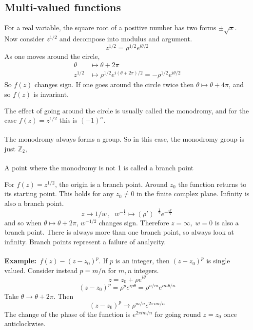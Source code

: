 \documentclass{article}
\newcommand{\example}{\textbf{Example:}}
\begin{document}
\subsection*{Multi-valued functions}
For a real variable, the square root of a positive number has two forms
$\pm \sqrt{x} $.
\\
Now consider $z^{1/2}$ and decompose into modulus and argument.
\[z^{1/2} = \rho^{1/2} e^{i\theta /2} \]
As one moves around the circle,
\begin{align*}
\theta & \mapsto \theta + 2\pi \\
z^{1/2} & \mapsto \rho^{1/2} e^{i(\theta + 2\pi)/2} = -\rho^{1/2}
e^{i\theta /2} 
\end{align*}
So $f(z)$ changes sign. If one goes around the circle twice then
$\theta \mapsto \theta + 4\pi$, and so $f(z)$ is invariant.
\\
\begin{framed}
\noindent The effect of going around the circle is usually called the monodromy,
and for the case $f(z) = z^{1/2}$ this is $(-1)^n$.
\\
\\
The monodromy always forms a group. So in this case, the monodromy group
is just $\mathbb{Z}_2$,
\\
\\
A point where the monodromy is not 1 is called a branch point
\end{framed}
For $f(z) = z^{1/2}$, the origin is a branch point. Around $z_0$
the function returns to its starting point. This holds for any $z_0 \neq 0$
in the finite complex plane.
Infinity is also a branch point.
\[ z \mapsto 1/w \, , \;\; w^{-\frac{1}{2}} \mapsto (\rho')^{-\frac{1}{2}} 
e^{-\frac{i\theta'}{2}}\]
and so when $\theta \mapsto \theta + 2\pi$, $w^{-1/2}$ changes sign.
Therefore $z= \infty, \; w=0$ is also a branch point.
There is always more than one branch point, so always look at infinity.
Branch points represent a failure of analycity.
\\
\\
\example\ $f(z)-(z-z_0)^p$. If $p$ is an integer, then $(z-z_0)^p$ is single
valued. Consider instead $p=m/n$ for $m,n$ integers.
\[ z = z_0 + \rho e^{i\theta}\]
\[ (z-z_0)^p = \rho^p e^{ip\theta} = \rho^{n/m}e^{im\theta /n} \]
Take $\theta \to \theta + 2\pi$. Then
\[ (z-z_0)^p \to \rho^{m/n} e^{2\pi i m / n} \]
The change of the phase of the function is $\displaystyle e^{2\pi im/n}$
for going round $z=z_0$ once anticlockwise.
\\
\end{document}

